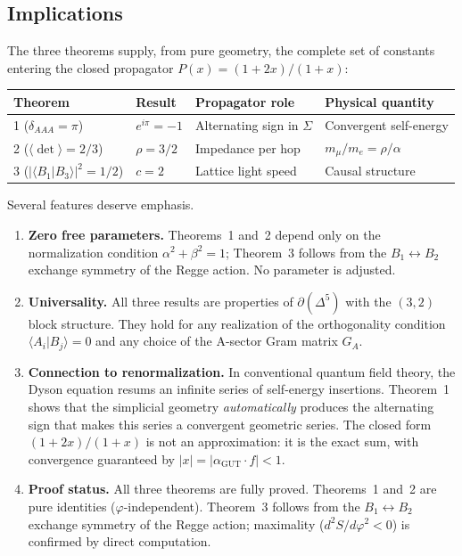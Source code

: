 \documentclass[12pt]{article}
\theoremstyle{remark}
\theoremstyle{definition}
\newcommand{\agut}{\alpha_{\mathrm{GUT}}}
\begin{document}
\subsection{Implications}
\label{sec:variational_implications}

The three theorems supply, from pure geometry, the complete set of
constants entering the closed propagator $P(x) = (1+2x)/(1+x)$:

\begin{center}
\renewcommand{\arraystretch}{1.3}
\begin{tabular}{llll}
\toprule
Theorem & Result & Propagator role & Physical quantity \\
\midrule
1 ($\delta_{AAA} = \pi$) & $e^{i\pi} = -1$ & Alternating sign in $\Sigma$ & Convergent self-energy \\
2 ($\langle\det\rangle = 2/3$) & $\rho = 3/2$ & Impedance per hop & $m_\mu/m_e = \rho/\alpha$ \\
3 ($|\langle B_1|B_3\rangle|^2 = 1/2$) & $c = 2$ & Lattice light speed & Causal structure \\
\bottomrule
\end{tabular}
\end{center}

\noindent
Several features deserve emphasis.

\begin{enumerate}
\item \textbf{Zero free parameters.}
Theorems~1 and~2 depend only on the normalization condition
$\alpha^2 + \beta^2 = 1$; Theorem~3 follows from the $B_1 \leftrightarrow B_2$
exchange symmetry of the Regge action.  No parameter is adjusted.

\item \textbf{Universality.}
All three results are properties of $\partial(\Delta^5)$ with the
$(3,2)$ block structure.  They hold for any realization of the
orthogonality condition $\langle A_i | B_j \rangle = 0$ and any
choice of the A-sector Gram matrix $G_A$.

\item \textbf{Connection to renormalization.}
In conventional quantum field theory, the Dyson equation resums an
infinite series of self-energy insertions.  Theorem~1 shows that the
simplicial geometry \emph{automatically} produces the alternating sign
that makes this series a convergent geometric series.  The closed form
$(1+2x)/(1+x)$ is not an approximation: it is the exact sum, with
convergence guaranteed by $|x| = |\agut \cdot f| < 1$.

\item \textbf{Proof status.}
All three theorems are fully proved.  Theorems~1 and~2 are pure identities ($\varphi$-independent).  Theorem~3 follows from the $B_1 \leftrightarrow B_2$ exchange symmetry of the Regge action; maximality ($d^2S/d\varphi^2 < 0$) is confirmed by direct computation.
\end{enumerate}
\end{document}
